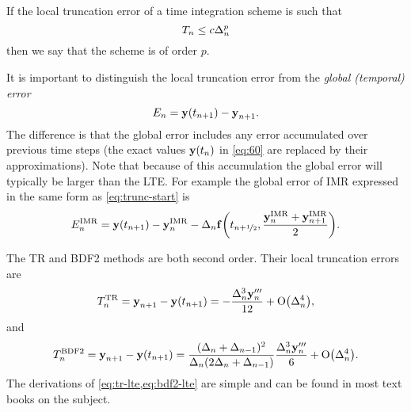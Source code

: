 If the local truncation error of a time integration scheme is such that
\begin{equation}
  T_n \leq c \Delta_{n}^p
\end{equation}
then we say that the scheme is of order $p$.

It is important to distinguish the local truncation error from the \emph{global (temporal) error}
\begin{equation}
  \label{eq:global-temporal-error}
    E_n = \boldsymbol{\mathrm{y}}(t_{n+1}) - \boldsymbol{\mathrm{y}}_{n+1}.
\end{equation}
The difference is that the global error includes any error accumulated over previous time steps (\ie the exact values $\boldsymbol{\mathrm{y}}(t_n)$ in \cref{eq:60} are replaced by their approximations).
Note that because of this accumulation the global error will typically be larger than the LTE.
For example the global error of IMR expressed in the same form as \cref{eq:trunc-start} is
\begin{equation}
  E_n^{\mathrm{IMR}} =  \boldsymbol{\mathrm{y}}(t_{n+1}) - \boldsymbol{\mathrm{y}}_n^{\mathrm{IMR}} - \Delta_{n} {\boldsymbol{\mathrm{f}}{\left(  t_{n+\nicefrac{1}{2}}, \frac{\boldsymbol{\mathrm{y}}_n^{\mathrm{IMR}} + \boldsymbol{\mathrm{y}}_{n+1}^{\mathrm{IMR}}}{2}  \right)}}.
\end{equation}

The TR and BDF2 methods are both second order.
Their local truncation errors are \cite[261]{GreshoSani}
\begin{equation}
  \label{eq:tr-lte}
  T_n^{\mathrm{TR}} = \boldsymbol{\mathrm{y}}_{n+1} - \boldsymbol{\mathrm{y}}(t_{n+1}) = -\frac{\Delta_{n}^3 \boldsymbol{\mathrm{y}}_n'''}{12}
  + \mathrm{O}{\left( \Delta_{n}^4 \right)},
\end{equation}
and \cite[715]{GreshoSani}
\begin{equation}
  \label{eq:bdf2-lte}
  T_n^{\mathrm{BDF2}} = \boldsymbol{\mathrm{y}}_{n+1} - \boldsymbol{\mathrm{y}}(t_{n+1}) = \frac{(\Delta_{n} + \Delta_{n-1})^2}{\Delta_{n}(2\Delta_{n} + \Delta_{n-1})}
  \frac{\Delta_{n}^3 \boldsymbol{\mathrm{y}}_n'''}{6}
  + \mathrm{O}{\left( \Delta_{n}^4 \right)}.
\end{equation}
The derivations of \cref{eq:tr-lte,eq:bdf2-lte} are simple and can be found in most text books on the subject.

